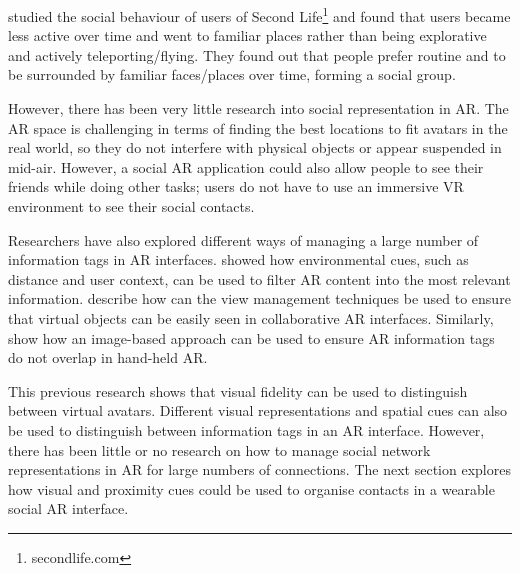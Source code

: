 \textcite{Harris2009} studied the social behaviour of users of Second Life\footnote{secondlife.com} and found that users became less active over time and went to familiar places rather than being explorative and actively teleporting/flying. They found out that people prefer routine and to be surrounded by familiar faces/places over time, forming a social group.

However, there has been very little research into social representation in AR. The AR space is challenging in terms of finding the best locations to fit avatars in the real world, so they do not interfere with physical objects or appear suspended in mid-air. However, a social AR application could also allow people to see their friends while doing other tasks; users do not have to use an immersive VR environment to see their social contacts.

Researchers have also explored different ways of managing a large number of information tags in AR interfaces. \textcite{Julier2002} showed how environmental cues, such as distance and user context, can be used to filter AR content into the most relevant information. \textcite{Hollerer2001} describe how can the view management techniques be used to ensure that virtual objects can be easily seen in collaborative AR interfaces. Similarly, \textcite{Grasset2012} show how an image-based approach can be used to ensure AR information tags do not overlap in hand-held AR. 

This previous research shows that visual fidelity can be used to distinguish between virtual avatars. Different visual representations and spatial cues can also be used to distinguish between information tags in an AR interface. However, there has been little or no research on how to manage social network representations in AR for large numbers of connections. The next section explores how visual and proximity cues could be used to organise contacts in a wearable social AR interface.




